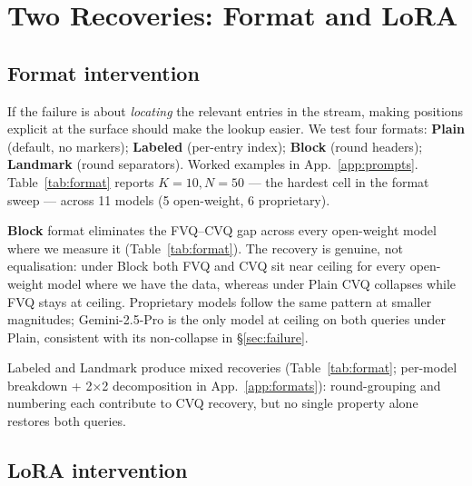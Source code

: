 \documentclass[11pt]{article}
\begin{document}
\section{Two Recoveries: Format and LoRA}
\label{sec:recoveries}

\subsection{Format intervention}
\label{sec:recoveries:format}

If the failure is about \emph{locating} the relevant entries in
the stream, making positions explicit at the surface should make
the lookup easier. We test four formats: \textbf{Plain} (default,
no markers); \textbf{Labeled} (per-entry index); \textbf{Block}
(round headers); \textbf{Landmark} (round separators). Worked
examples in App.~\ref{app:prompts}. Table~\ref{tab:format} reports
$K{=}10, N{=}50$ --- the hardest cell in the format sweep --- across
11 models (5 open-weight, 6 proprietary).

\begin{table}[t]
\centering
\small

\caption{Format-intervention results on Semantic-Multi
($K{=}10, N{=}50$). Each cell shows \textbf{FVQ / CVQ accuracy};
gap $\Delta = $ FVQ $-$ CVQ. Plain is the default condition from
\S\ref{sec:failure}. Wilson half-widths in
Appendix~\ref{app:formats}, Table~\ref{tab:format_ci}.}
\label{tab:format}
\end{table}

\textbf{Block} format eliminates the FVQ--CVQ gap across every
open-weight model where we measure it (Table~\ref{tab:format}).
The recovery is genuine, not equalisation: under Block both FVQ and
CVQ sit near ceiling for every open-weight model where we have the
data, whereas under Plain CVQ collapses while FVQ stays at ceiling.
Proprietary models follow the same pattern at smaller magnitudes;
Gemini-2.5-Pro is the only model at ceiling on both queries under
Plain, consistent with its non-collapse in \S\ref{sec:failure}.

Labeled and Landmark produce mixed recoveries
(Table~\ref{tab:format}; per-model breakdown + 2×2 decomposition in
App.~\ref{app:formats}): round-grouping and numbering each
contribute to CVQ recovery, but no single property alone restores
both queries.

\subsection{LoRA intervention}
\label{sec:recoveries:lora}
\end{document}
